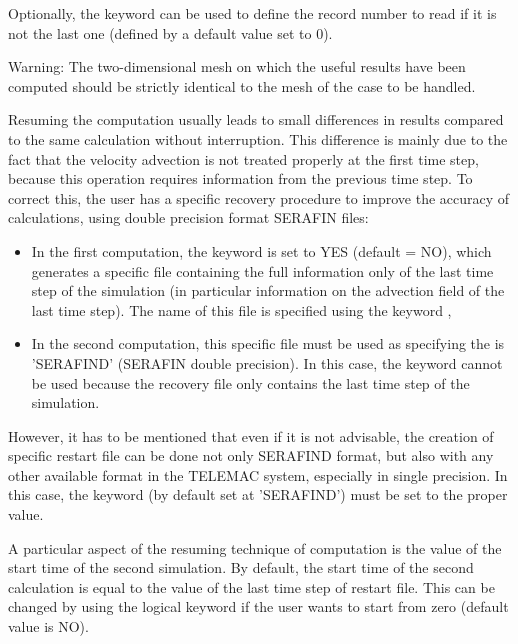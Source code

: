Optionally, the keyword  can be used to
define the record number to read if it is not the last one (defined by a
default value set to 0).

\begin{WarningBlock}{Warning:}
The two-dimensional mesh on which the useful results have been computed should
be strictly identical to the mesh of the case to be handled.
\end{WarningBlock}

Resuming the computation usually leads to small differences in results
compared to the same calculation without interruption. This difference is
mainly due to the fact that the velocity advection is not treated properly at
the first time step, because this operation requires information from the
previous time step. To correct this, the user has a specific recovery procedure
to improve the accuracy of calculations, using double precision format SERAFIN
files:

\begin{itemize}
\item In the first computation, the keyword  is set to
YES (default = NO),
which generates a specific file containing the full information only of
the last time step of the simulation (in particular information on the
advection field of the last time step). The name of this file is specified
using the keyword ,

\item In the second computation, this specific file must be used as
 specifying the  is 'SERAFIND' (SERAFIN double precision). In this case, the
keyword  cannot be used because the recovery
file only contains the last time step of the simulation.
\end{itemize}

However, it has to be mentioned that even if it is not advisable, the creation
of specific restart file can be done not only SERAFIND format, but also with
any other available format in the TELEMAC system, especially in single
precision. In this case, the keyword  (by default
set at 'SERAFIND') must be set to the proper value.

A particular aspect of the resuming technique of computation is the value of
the start time of the second simulation. By default, the start time of the
second calculation is equal to the value of the last time step of restart file.
This can be changed by using the logical keyword  if the user wants to start from zero (default value is NO).

